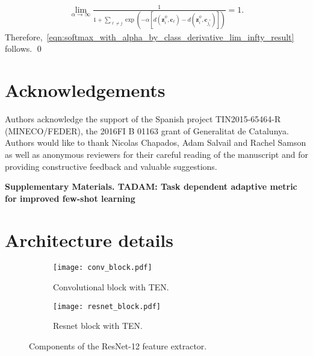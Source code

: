\documentclass{article}
\renewcommand{\vec}[1]{\mathbf{#1}}
\newcommand{\metric}{d}
\begin{document}
\begin{align} 
\lim_{\alpha \to \infty} \frac{1}{1 + \sum_{\ell \neq j}  \exp(-\alpha [\metric(\vec{z}_i^{\phi}, \vec{c}_\ell) - \metric(\vec{z}_i^{\phi}, \vec{c}_{j_{i}^*})])} = 1. \nonumber
\end{align}
Therefore,~\eqref{eqn:softmax_with_alpha_by_class_derivative_lim_infty_result} follows. \qed

\section*{Acknowledgements}
Authors acknowledge the support of the Spanish project TIN2015-65464-R (MINECO/FEDER), the 2016FI B 01163 grant of Generalitat de Catalunya. Authors would like to thank Nicolas Chapados, Adam Salvail and Rachel Samson as well as anonymous reviewers for their careful reading of the manuscript and for providing constructive feedback and valuable suggestions.



    



\newpage
\pagebreak
\begin{center}
\textbf{\large Supplementary Materials. TADAM: Task dependent adaptive metric for improved few-shot learning}
\end{center}
\setcounter{equation}{0}
\setcounter{figure}{0}
\setcounter{table}{0}
\setcounter{page}{1}
\setcounter{section}{0}
\makeatletter
\gdef\thesection{S\@arabic\c@section}


\section{Architecture details} \label{ssec:components_of_architecture}

\begin{figure}[h]
    \centering
    \begin{subfigure}[t]{0.35\textwidth}
        \centering
        \texttt{[image: conv\_block.pdf]}
        \caption{Convolutional block with TEN.}
        \label{fig:conv_block}
    \end{subfigure} \hspace{0.15\textwidth}
    \begin{subfigure}[t]{0.3\textwidth}
        \centering
        \texttt{[image: resnet\_block.pdf]}
        \caption{Resnet block with TEN.}
        \label{fig:resnet_block}
    \end{subfigure}
    \caption{Components of the ResNet-12 feature extractor.}
    \label{fig:ten_resnet_details}
\end{figure}
\end{document}
